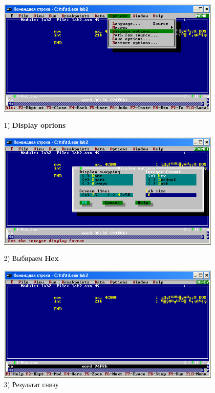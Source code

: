\begin{figure}[!htp]
    \centering
    \begin{minipage}{0.32\textwidth}
        \centering
        \includegraphics[width=.99\linewidth]
            {../_INCLUDES/task-4-13-1/1.png}
        \caption{1) \textbf{Display oprions}}
        \label{fig:task_4_13__1}
    \end{minipage}
    \begin {minipage}{0.32\textwidth}
        \centering
        \includegraphics[width=.99\linewidth]
            {../_INCLUDES/task-4-13-1/2.png}
        \caption{2) Выбираем \textbf{Hex}}
        \label{fig:task_4_13__2}
    \end{minipage}
    \begin {minipage}{0.32\textwidth}
        \centering
        \includegraphics[width=.99\linewidth]
            {../_INCLUDES/task-4-13-1/3.png}
        \caption{3) Результат снизу}
        \label{fig:task_4_13__3}
    \end{minipage}
\end{figure}
